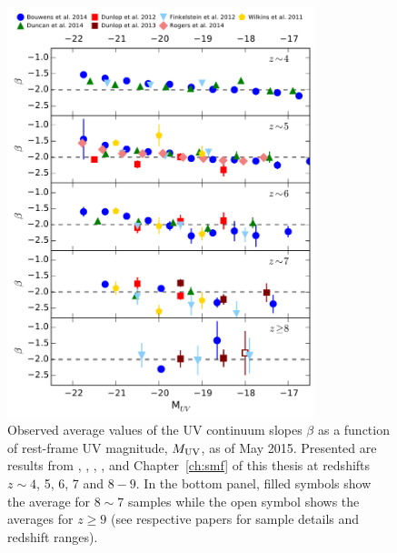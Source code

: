 \begin{figure}
\centering
  \includegraphics[width=0.8\textwidth]{plots/Fig2.pdf}
  \caption[Observed average values of the UV continuum slopes $\beta$ as a function of rest-frame UV magnitude, $M_{\rm{UV}}$, as of May 2015.]{Observed average values of the UV continuum slopes $\beta$ as a function of rest-frame UV magnitude, $M_{\rm{UV}}$, as of May 2015. Presented are results from \citet{Wilkins:2011fs}, \citet{Dunlop:2011jl,Dunlop:2013kp}, \citet{2012ApJ...756..164F}, \citet{Bouwens:2013vf}, \citet{Rogers:2014bn} and Chapter~\ref{ch:smf} of this thesis at redshifts $z\sim4$, 5, 6, 7 and $8-9$. In the bottom panel, filled symbols show the average for $8\sim7$ samples while the open symbol shows the averages for $z\geq 9$ (see respective papers for sample details and redshift ranges).}
  \label{reion-fig:beta_z}
\end{figure}


